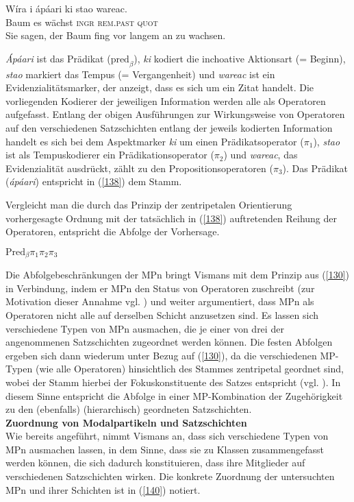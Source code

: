 \begin{exe}
	\jamwidth=5cm\relax
	\ex\label{138}
	\gll W\'{i}ra   i   \'{a}p\'{a}ari   ki    stao          wareac. \\
	Baum es wächst \textsc{ingr} \textsc{rem.past} \textsc{quot}\\
	\glt Sie sagen, der Baum fing vor langem an zu wachsen.
	\newline
\hbox{}\hfill\hbox {\citet[141]{Hengeveld1989}}	
\end{exe}	
\textit{\'{A}p\'{a}ari} ist das Prädikat ($\textrm{pred}_{\beta}$), \textit{ki} kodiert die inchoative Aktionsart (= Beginn), \textit{stao} markiert das Tempus (= Vergangenheit) und \textit{wareac} ist ein Evidenzialitätsmarker, der anzeigt, dass es sich um ein Zitat handelt. Die vorliegenden Kodierer der jeweiligen Information werden alle als Operatoren aufgefasst. Entlang der obigen Ausführungen zur Wirkungsweise von Operatoren auf den verschiedenen Satzschichten entlang der jeweils kodierten Information handelt es sich bei dem Aspektmarker \textit{ki} um einen Prädikatsoperator ($\pi_{\textrm{1}}$), \textit{stao} ist als Tempuskodierer ein Prädikationsoperator ($\pi_{\textrm{2}}$) und \textit{wareac}, das Evidenzialität ausdrückt, zählt zu den Propositionsoperatoren ($\pi_{\textrm{3}}$). Das Prädikat (\textit{\'{a}p\'{a}ari}) entspricht in (\ref{138}) dem Stamm.

Vergleicht man die durch das Prinzip der zentripetalen Orientierung vorhergesagte Ordnung mit der tatsächlich in (\ref{138}) auftretenden Reihung der Operatoren, entspricht die Abfolge der Vorhersage.

\begin{exe}
	\ex\label{139} 
		$\textrm{Pred}_{\beta}\pi_{\textrm{1}} \pi_{\textrm{2}} \pi_{\textrm{3}}$	
\end{exe}
Die Abfolgebeschränkungen der MPn bringt Vismans mit dem Prinzip aus (\ref{130}) in Verbindung, indem er MPn den Status von Operatoren zuschreibt (zur Motivation dieser Annahme vgl. \citealt[129-139]{Vismans1994}) und weiter argumentiert, dass MPn als Operatoren nicht alle auf derselben Schicht anzusetzen sind. Es lassen sich verschiedene Typen von MPn ausmachen, die je einer von drei der angenommenen Satzschichten zugeordnet werden können. Die festen Abfolgen ergeben sich dann wiederum unter Bezug auf (\ref{130}), da die verschiedenen MP-Typen (wie alle Operatoren) hinsichtlich des Stammes zentripetal geordnet sind, wobei der Stamm hierbei der Fokuskonstituente des Satzes entspricht (vgl. \citealt[142]{Vismans1994}). In diesem Sinne entspricht die Abfolge in einer MP-Kombination der Zugehörigkeit zu den (ebenfalls) (hierarchisch) geordneten Satzschichten.\\
\newline
\noindent
\textbf{Zuordnung von Modalpartikeln und Satzschichten}\\
Wie bereits angeführt, nimmt Vismans an, dass sich verschiedene Typen von MPn ausmachen lassen, in dem Sinne, dass sie zu Klassen zusammengefasst werden können, die sich dadurch konstituieren, dass ihre Mitglieder auf verschiedenen Satzschichten wirken. Die konkrete Zuordnung der untersuchten MPn und ihrer Schichten ist in (\ref{140}) notiert.

